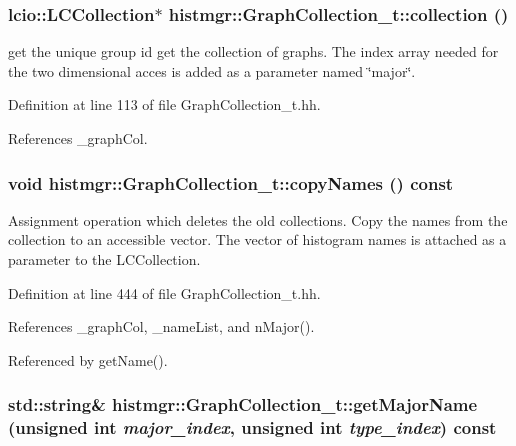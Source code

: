\subsubsection[{collection}]{\setlength{\rightskip}{0pt plus 5cm}lcio::LCCollection$\ast$ histmgr::GraphCollection\_\-t::collection ()\hspace{0.3cm}{\ttfamily  [inline]}}\label{classhistmgr_1_1GraphCollection__t_a10bbe40ded94d3664d9eca002986075e}


get the unique group id get the collection of graphs. The index array needed for the two dimensional acces is added as a parameter named \char`\"{}major\char`\"{}. 

Definition at line 113 of file GraphCollection\_\-t.hh.

References \_\-graphCol.
\subsubsection[{copyNames}]{\setlength{\rightskip}{0pt plus 5cm}void histmgr::GraphCollection\_\-t::copyNames () const\hspace{0.3cm}{\ttfamily  [inline, private]}}\label{classhistmgr_1_1GraphCollection__t_abf045126bb8f97d49b3e07d776c5724a}


Assignment operation which deletes the old collections. Copy the names from the collection to an accessible vector. The vector of histogram names is attached as a parameter to the LCCollection. 

Definition at line 444 of file GraphCollection\_\-t.hh.

References \_\-graphCol, \_\-nameList, and nMajor().

Referenced by getName().
\subsubsection[{getMajorName}]{\setlength{\rightskip}{0pt plus 5cm}std::string\& histmgr::GraphCollection\_\-t::getMajorName (unsigned int {\em major\_\-index}, \/  unsigned int {\em type\_\-index}) const}\label{classhistmgr_1_1GraphCollection__t_a83cbcc31d10a4ee5ad144dbbab667b28}


